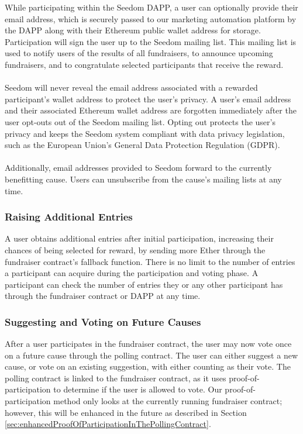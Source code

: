 \documentclass[11pt]{article}
\begin{document}
While participating within the Seedom DAPP, a user can optionally provide their email address, which is securely passed to our marketing automation platform by the DAPP along with their Ethereum public wallet address for storage. Participation will sign the user up to the Seedom mailing list. This mailing list is used to notify users of the results of all fundraisers, to announce upcoming fundraisers, and to congratulate selected participants that receive the reward.\\\\
Seedom will never reveal the email address associated with a rewarded participant's wallet address to protect the user's privacy. A user's email address and their associated Ethereum wallet address are forgotten immediately after the user opt-outs out of the Seedom mailing list. Opting out protects the user's privacy and keeps the Seedom system compliant with data privacy legislation, such as the European Union's General Data Protection Regulation (GDPR).\\\\
Additionally, email addresses provided to Seedom forward to the currently benefitting cause. Users can unsubscribe from the cause's mailing lists at any time.

\subsubsection{Raising Additional Entries}

A user obtains additional entries after initial participation, increasing their chances of being selected for reward, by sending more Ether through the fundraiser contract's fallback function. There is no limit to the number of entries a participant can acquire during the participation and voting phase. A participant can check the number of entries they or any other participant has through the fundraiser contract or DAPP at any time.

\subsubsection{Suggesting and Voting on Future Causes}

After a user participates in the fundraiser contract, the user may now vote once on a future cause through the polling contract. The user can either suggest a new cause, or vote on an existing suggestion, with either counting as their vote. The polling contract is linked to the fundraiser contract, as it uses proof-of-participation to determine if the user is allowed to vote. Our proof-of-participation method only looks at the currently running fundraiser contract; however, this will be enhanced in the future as described in Section \ref{sec:enhancedProofOfParticipationInThePollingContract}.
\end{document}
